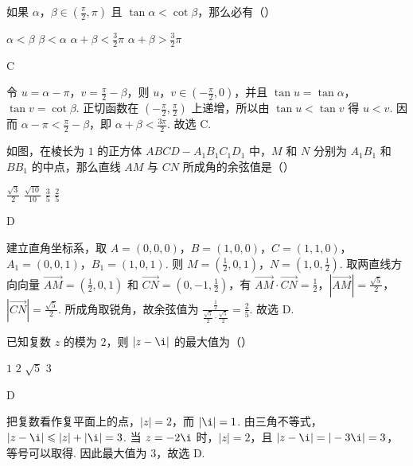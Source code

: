 \begin{problem}
如果 \(\alpha\)，\(\beta \in \left(\frac{\pi}{2}, \pi\right)\) 且 \(\tan \alpha < \cot \beta\)，那么必有（\quad）

\choices
    {\(\alpha < \beta\)}
    {\(\beta < \alpha\)}
    {\(\alpha + \beta < \frac{3}{2}\pi\)}
    {\(\alpha + \beta > \frac{3}{2}\pi\)}

\begin{answer}
C
\end{answer}

\begin{solution}
令 \(u=\alpha-\pi\)，\(v=\frac{\pi}{2}-\beta\)，则 \(u\)，\(v\in\left(-\frac{\pi}{2},0\right)\)，并且 \(\tan u=\tan\alpha\)，\(\tan v=\cot\beta\). 正切函数在 \(\left(-\frac{\pi}{2},\frac{\pi}{2}\right)\) 上递增，所以由 \(\tan u<\tan v\) 得 \(u<v\). 因而 \(\alpha-\pi<\frac{\pi}{2}-\beta\)，即 \(\alpha+\beta<\frac{3\pi}{2}\). 故选 C.
\end{solution}
\end{problem}

\begin{problem}
如图，在棱长为 \(1\) 的正方体 \(ABCD-A_{1}B_{1}C_{1}D_{1}\) 中，\(M\) 和 \(N\) 分别为 \(A_{1}B_{1}\) 和 \(BB_{1}\) 的中点，那么直线 \(AM\) 与 \(CN\) 所成角的余弦值是（\quad）


\choices
    {\(\frac{\sqrt{3}}{2}\)}
    {\(\frac{\sqrt{10}}{10}\)}
    {\(\frac{3}{5}\)}
    {\(\frac{2}{5}\)}

\begin{answer}
D
\end{answer}

\begin{solution}
建立直角坐标系，取 \(A=(0,0,0)\)，\(B=(1,0,0)\)，\(C=(1,1,0)\)，\(A_1=(0,0,1)\)，\(B_1=(1,0,1)\). 则 \(M=\left(\frac{1}{2},0,1\right)\)，\(N=\left(1,0,\frac{1}{2}\right)\). 取两直线方向向量 \(\overrightarrow{AM}=\left(\frac{1}{2},0,1\right)\) 和 \(\overrightarrow{CN}=\left(0,-1,\frac{1}{2}\right)\)，有
\(\overrightarrow{AM}\cdot\overrightarrow{CN}=\frac{1}{2}\)，\(\left|\overrightarrow{AM}\right|=\frac{\sqrt{5}}{2}\)，\(\left|\overrightarrow{CN}\right|=\frac{\sqrt{5}}{2}\). 所成角取锐角，故余弦值为 \(\frac{\frac{1}{2}}{\frac{\sqrt{5}}{2}\cdot\frac{\sqrt{5}}{2}}=\frac{2}{5}\). 故选 D.
\end{solution}
\end{problem}

\begin{problem}
已知复数 \(z\) 的模为 \(2\)，则 \(|z - \i|\) 的最大值为（\quad）

\choices
    {\(1\)}
    {\(2\)}
    {\(\sqrt{5}\)}
    {\(3\)}

\begin{answer}
D
\end{answer}

\begin{solution}
把复数看作复平面上的点，\(|z|=2\)，而 \(|\i|=1\). 由三角不等式，\(|z-\i|\leqslant |z|+|\i|=3\). 当 \(z=-2\i\) 时，\(|z|=2\)，且 \(|z-\i|=|-3\i|=3\)，等号可以取得. 因此最大值为 \(3\)，故选 D.
\end{solution}
\end{problem}

